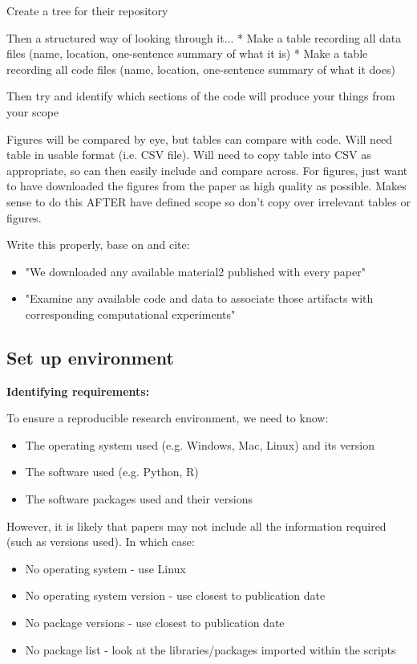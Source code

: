 Create a tree for their repository

Then a structured way of looking through it...
* Make a table recording all data files (name, location, one-sentence summary of what it is)
* Make a table recording all code files (name, location, one-sentence summary of what it does)

Then try and identify which sections of the code will produce your things from your scope

Figures will be compared by eye, but tables can compare with code. Will need table in usable format (i.e. CSV file). Will need to copy table into CSV as appropriate, so can then easily include and compare across. For figures, just want to have downloaded the figures from the paper as high quality as possible. Makes sense to do this AFTER have defined scope so don't copy over irrelevant tables or figures.

Write this properly, base on and cite:
\begin{itemize}
    \item "We downloaded any available material2 published with every paper"\cite{laurinavichyute_share_2022}
    \item "Examine any available code and data to associate those artifacts with corresponding computational experiments"\cite{krafczyk_learning_2021}
\end{itemize}

\subsection{Set up environment}

\textbf{Identifying requirements:}

To ensure a reproducible research environment, we need to know:
\begin{itemize}
    \item The operating system used (e.g. Windows, Mac, Linux) and its version 
    \item The software used (e.g. Python, R)
    \item The software packages used and their versions\autocite{the_turing_way_community_turing_2022}
\end{itemize}

However, it is likely that papers may not include all the information required (such as versions used). In which case:
\begin{itemize}
    \item No operating system - use Linux
    \item No operating system version - use closest to publication date
    \item No package versions - use closest to publication date
    \item No package list - look at the libraries/packages imported within the scripts
\end{itemize}

